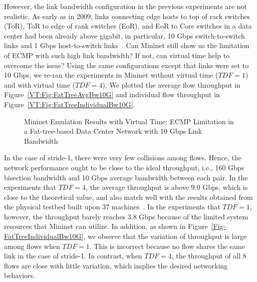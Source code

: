 However, the link bandwidth configuration in the previous experiments are not realistic.
As early as in 2009, links connecting edge hosts to top of rack switches (ToR), ToR to edge of rank switches (EoR),
and EoR to Core switches in a data center had been already above gigabit,
in particular, 10 Gbps switch-to-switch links and 1 Gbps host-to-switch links~\cite{ScaleEffDCN}.
Can Mininet still show us the limitation of ECMP with such high link bandwidth?
If not, can virtual time help to overcome the issue?
Using the same configurations except that links were set to 10 Gbps,
we re-ran the experiments in Mininet without virtual time ($TDF=1$) and with virtual time ($TDF = 4$).
We plotted the average flow throughput in Figure~\ref{VT:Fig:FatTreeAvgBw10G} and
individual flow throughput in Figure~\ref{VT:Fig:FatTreeIndividualBw10G}.

\begin{figure}[ht]
\centering
\caption[Emulate ECMP with High Link Bandwdith]{Mininet Emulation Results with Virtual Time: ECMP Limitation in a Fat-tree-based Data Center Network with 10 Gbps Link Bandwidth}
\end{figure}

In the case of stride-1, there were very few collisions among flows.
Hence, the network performance ought to be close to the ideal throughput, i.e., 160 Gbps bisection bandwidth and 10 Gbps average bandwidth between each pair.
In the experiments that $TDF=4$, the average throughput is above 9.0 Gbps, which is close to the theoretical value,
and also match well with the results obtained from the physical testbed built upon 37 machines~\cite{Hedera}.
In the experiments that $TDF=1$, however, the throughput barely reaches 3.8 Gbps because of the limited system resources that Mininet can utilize.
In addition, as shown in Figure~\ref{Fig-FatTreeIndividualBw10G},
we observe that the variation of throughput is large among flows when $TDF=1$.
This is incorrect because no flow shares the same link in the case of stride-1.
In contrast, when $TDF = 4$, the throughput of all 8 flows are close with little variation, which implies the desired networking behaviors. 

